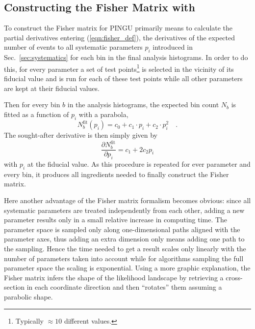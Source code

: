 \subsection{Constructing the Fisher Matrix with \papa}

To construct the Fisher matrix for PINGU primarily means to calculate the 
partial
derivatives entering (\ref{eqn:fisher_def}), \ie the derivatives of the
expected number of events \wrt to all systematic parameters $p_i$ introduced in
Sec.~\ref{sec:systematics} for each bin in the final analysis histograms. In
order to do this, for every parameter a set of test points\footnote{Typically
$\approx 10$ different values.} is selected in the vicinity of its fiducial 
value and \papa is run for each of these test points while all other parameters 
are kept at their fiducial values.

Then for every bin $b$ in the analysis histograms, the expected bin count $N_b$
is fitted as a function of $p_i$ with a parabola, \ie
\begin{equation}
 N_b^\mathrm{fit}(p_i) = c_0 + c_1\cdot p_i + c_2\cdot p_i^2 \quad.
\end{equation}
The sought-after derivative is then simply given by
\begin{equation}
 \frac{\partial N_b^\mathrm{fit}}{\partial p_i} = c_1 + 2 c_2 p_i 
\end{equation}
with $p_i$ at the fiducial value. As this procedure is repeated for ever
parameter and every bin, it produces all ingredients needed to finally
construct the Fisher matrix.

Here another advantage of the Fisher matrix formalism becomes obvious: since
all systematic parameters are treated independently from each other, adding a
new parameter results only in a small relative increase in computing time.
The parameter space is sampled only along one-dimensional paths aligned with
the parameter axes, thus adding an extra dimension only means adding one path
to the sampling. Hence the time needed to get a result scales only linearly
with the number of parameters taken into account while for algorithms sampling
the full parameter space the scaling is exponential. Using a more graphic
explanation, the Fisher matrix infers the shape of the likelihood landscape by
retrieving a cross-section in each coordinate direction and then ``rotates''
them assuming a parabolic shape.